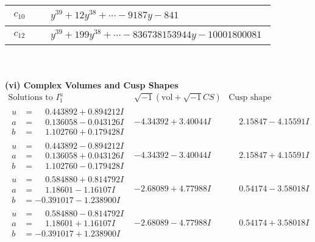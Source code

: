 \documentclass[1p]{elsarticle_modified}
\theoremstyle{definition}
\newcommand{\I}{\sqrt{-1}}
\begin{document}
\begin{tabular}{m{50pt}|m{274pt}}
\hline $$\begin{aligned}c_{10}\end{aligned}$$&$\begin{aligned}
&y^{39}+12 y^{38}+\cdots-9187 y-841
\end{aligned}$\\
\hline $$\begin{aligned}c_{12}\end{aligned}$$&$\begin{aligned}
&y^{39}+199 y^{38}+\cdots-836738153944 y-10001800081
\end{aligned}$\\
\hline
\end{tabular}\\~\\
\newpage\flushleft \textbf{(vi) Complex Volumes and Cusp Shapes}
$$\begin{array}{c|c|c}  
\text{Solutions to }I^u_{1}& \I (\text{vol} + \sqrt{-1}CS) & \text{Cusp shape}\\
 \hline 
\begin{aligned}
u &= \phantom{-}0.443892 + 0.894212 I \\
a &= \phantom{-}0.136058 - 0.043126 I \\
b &= \phantom{-}1.102760 + 0.179428 I\end{aligned}
 & -4.34392 + 3.40044 I & \phantom{-}2.15847 - 4.15591 I \\ \hline\begin{aligned}
u &= \phantom{-}0.443892 - 0.894212 I \\
a &= \phantom{-}0.136058 + 0.043126 I \\
b &= \phantom{-}1.102760 - 0.179428 I\end{aligned}
 & -4.34392 - 3.40044 I & \phantom{-}2.15847 + 4.15591 I \\ \hline\begin{aligned}
u &= \phantom{-}0.584880 + 0.814792 I \\
a &= \phantom{-}1.18601 - 1.16107 I \\
b &= -0.391017 - 1.238900 I\end{aligned}
 & -2.68089 + 4.77988 I & \phantom{-}0.54174 - 3.58018 I \\ \hline\begin{aligned}
u &= \phantom{-}0.584880 - 0.814792 I \\
a &= \phantom{-}1.18601 + 1.16107 I \\
b &= -0.391017 + 1.238900 I\end{aligned}
 & -2.68089 - 4.77988 I & \phantom{-}0.54174 + 3.58018 I \\ \hline\begin{aligned}

\end{aligned}
\end{array}$$
\end{document}
